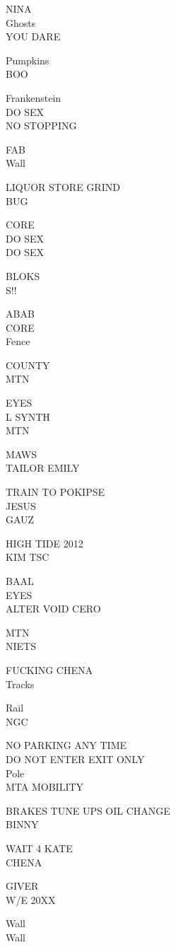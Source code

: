 \documentclass[10pt,letterpaper]{article}
\begin{document}
NINA\\
Ghosts\\
YOU DARE

Pumpkins\\
BOO

Frankenstein\\
DO SEX\\
NO STOPPING

FAB\\
Wall

LIQUOR STORE GRIND\\
BUG

CORE\\
DO SEX\\
DO SEX

BLOKS\\
S!!

ABAB\\
CORE\\
Fence

COUNTY\\
MTN

EYES\\
L SYNTH\\
MTN

MAWS\\
TAILOR EMILY

TRAIN TO POKIPSE\\
JESUS\\
GAUZ

HIGH TIDE 2012\\
KIM TSC

BAAL\\
EYES\\
ALTER VOID CERO

MTN\\
NIETS

FUCKING CHENA\\
Tracks

Rail\\
NGC

NO PARKING ANY TIME\\
DO NOT ENTER EXIT ONLY\\
Pole\\
MTA MOBILITY

BRAKES TUNE UPS OIL CHANGE\\
BINNY

WAIT 4 KATE\\
CHENA

GIVER\\
W/E 20XX

Wall\\
Wall
\end{document}
